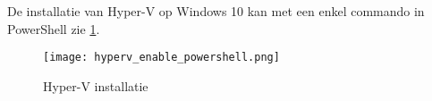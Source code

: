 De installatie van Hyper-V op Windows 10 kan met een enkel commando in PowerShell zie \ref{HV_install}.
\begin{figure}[h!]
	\centering
	\texttt{[image: hyperv\_enable\_powershell.png]}
	\caption{Hyper-V installatie}
	\label{HV_install}
\end{figure}

